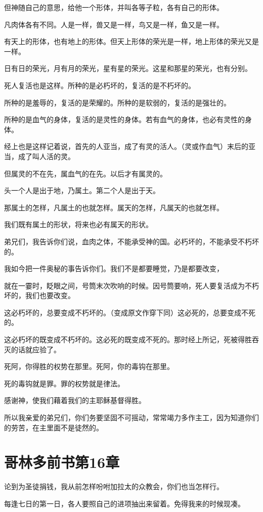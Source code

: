 \documentclass[12pt,oneside]{book}
\begin{document}
但神随自己的意思，给他一个形体，并叫各等子粒，各有自己的形体。

凡肉体各有不同。人是一样，兽又是一样，鸟又是一样，鱼又是一样。

有天上的形体，也有地上的形体。但天上形体的荣光是一样，地上形体的荣光又是一样。

日有日的荣光，月有月的荣光，星有星的荣光。这星和那星的荣光，也有分别。

死人复活也是这样。所种的是必朽坏的，复活的是不朽坏的。

所种的是羞辱的，复活的是荣耀的。所种的是软弱的，复活的是强壮的。

所种的是血气的身体，复活的是灵性的身体。若有血气的身体，也必有灵性的身体。

经上也是这样记着说，首先的人亚当，成了有灵的活人。（灵或作血气）末后的亚当，成了叫人活的灵。

但属灵的不在先，属血气的在先。以后才有属灵的。

头一个人是出于地，乃属土。第二个人是出于天。

那属土的怎样，凡属土的也就怎样。属天的怎样，凡属天的也就怎样。

我们既有属土的形状，将来也必有属天的形状。

弟兄们，我告诉你们说，血肉之体，不能承受神的国。必朽坏的，不能承受不朽坏的。

我如今把一件奥秘的事告诉你们。我们不是都要睡觉，乃是都要改变，

就在一霎时，眨眼之间，号筒末次吹响的时候。因号筒要响，死人要复活成为不朽坏的，我们也要改变。

这必朽坏的，总要变成不朽坏的。（变成原文作穿下同）这必死的，总要变成不死的。

这必朽坏的既变成不朽坏的。这必死的既变成不死的。那时经上所记，死被得胜吞灭的话就应验了。

死阿，你得胜的权势在那里。死阿，你的毒钩在那里。

死的毒钩就是罪。罪的权势就是律法。

感谢神，使我们藉着我们的主耶稣基督得胜。

所以我亲爱的弟兄们，你们务要坚固不可摇动，常常竭力多作主工，因为知道你们的劳苦，在主里面不是徒然的。

\chapter{哥林多前书第16章}
论到为圣徒捐钱，我从前怎样吩咐加拉太的众教会，你们也当怎样行。

每逢七日的第一日，各人要照自己的进项抽出来留着。免得我来的时候现凑。
\end{document}
